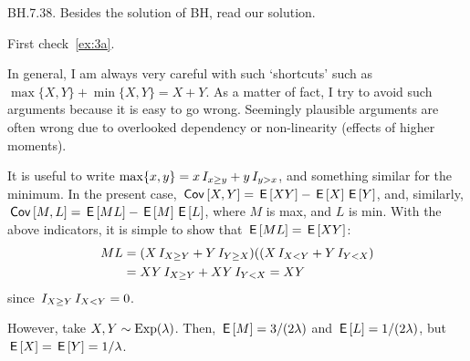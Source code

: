 \setcounter{theorem}{37}
\begin{exercise}
BH.7.38. Besides the solution of BH, read our solution.
\begin{solution}
First check~\cref{ex:3a}.

In general, I am always very careful with such `shortcuts' such as $\max\{X,Y\} + \min\{X, Y\} = X +Y$.  As a matter of fact, I try to avoid such arguments because it is easy to go wrong. Seemingly plausible arguments are often wrong due to overlooked dependency or non-linearity (effects of higher moments).

It is useful to write $\max\{x,y\} = x\,I_{x\geq y}+y\,I_{y>x}$, and something similar for the minimum. In the present case, $\,\mathsf{Cov}\left[X,Y\right] = \,\mathsf{E}\left[X Y\right]-\,\mathsf{E}\left[X\right] \,\mathsf{E}\left[Y\right]$, and, similarly, $\,\mathsf{Cov}\left[M,L\right] = \,\mathsf{E}\left[ML\right]- \,\mathsf{E}\left[M\right] \,\mathsf{E}\left[L\right]$, where $M$ is max, and $L$ is min. With the above indicators, it is simple to show that $\,\mathsf{E}\left[ML\right] = \,\mathsf{E}\left[X Y\right]$:
\begin{align*}
 ML
  &= (X\,I_{X\geq Y} + Y\,I_{Y\geq X})((X\,I_{X<Y} + Y\,I_{Y<X}) \\
  &= XY\,I_{X\geq Y} + XY\,I_{Y<X} = XY
\end{align*}
since $\,I_{X\geq Y}\,I_{X<Y} =0$.

However, take $X,Y\sim \mathrm{Exp}(\lambda)$. Then, $\,\mathsf{E}\left[M\right] = 3/(2\lambda)$ and $\,\mathsf{E}\left[L\right]= 1/(2\lambda)$, but $\,\mathsf{E}\left[X\right] = \,\mathsf{E}\left[Y\right] = 1/\lambda$.
\end{solution}
\end{exercise}

